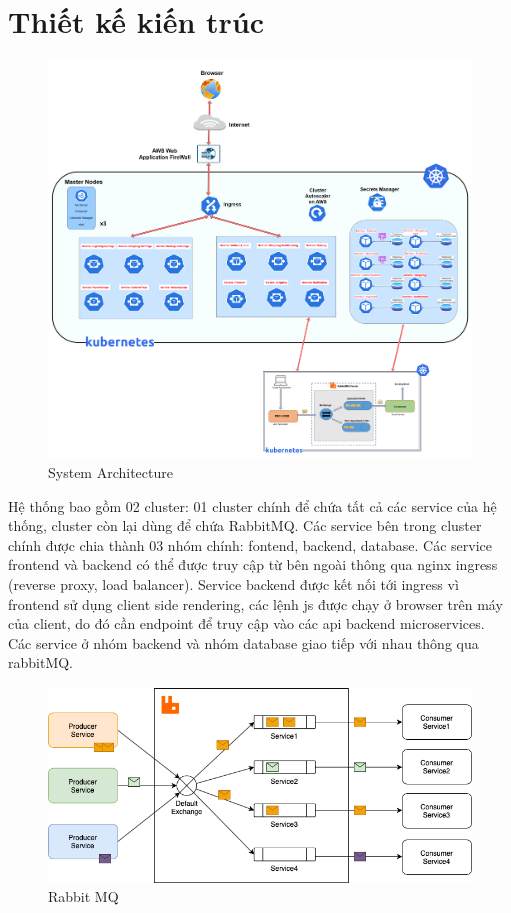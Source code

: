 \section{Thiết kế kiến trúc}
 \begin{figure}[H]
    \begin{center}
    \includegraphics[scale = 0.13]{images/phat/Architech_System.png}
    \vspace*{7mm}
    \caption{System Architecture}
    \end{center}
    \label{}
\end{figure}
\noindent Hệ thống bao gồm 02 cluster: 01 cluster chính để chứa tất cả các service của hệ thống, cluster còn lại dùng để chứa RabbitMQ. Các service bên trong cluster chính được chia thành 03 nhóm chính: fontend, backend, database. Các service frontend và backend có thể được truy cập từ bên ngoài thông qua nginx ingress (reverse proxy, load balancer). Service backend được kết nối tới ingress vì frontend sử dụng client side rendering, các lệnh js được chạy ở browser trên máy của client, do đó cần endpoint để truy cập vào các api backend microservices. Các service ở nhóm backend và nhóm database giao tiếp với nhau thông qua rabbitMQ.
\begin{figure}[H]
    \begin{center}
    \includegraphics[scale = 0.55]{images/phat/rabbitMQ.png}
    \vspace*{7mm}
    \caption{Rabbit MQ}
    \end{center}
    \label{}
\end{figure}
